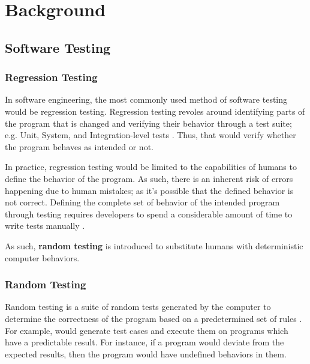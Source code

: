 \section{Background}
%

\subsection{Software Testing}

\subsubsection{Regression Testing}

In software engineering, the most commonly used method of software testing would be regression testing. Regression testing revoles around 
identifying parts of the program that is changed and verifying their behavior through a test suite; e.g. Unit, System, and Integration-level tests
\cite{testing}. Thus, that would verify whether the program behaves as intended or not.

In practice, regression testing would be limited to the capabilities of humans to define the behavior of the program. As such, there is an inherent 
risk of errors happening due to human mistakes; as it's possible that the defined behavior is not correct. Defining the complete set of behavior 
of the intended program through testing requires developers to spend a considerable amount of time to write tests manually \cite{differentialTesting}. 

As such, \textbf{random testing} is introduced to substitute humans with deterministic computer behaviors.

\subsubsection{Random Testing}

Random testing is a suite of random tests generated by the computer to determine the correctness of the program based on a predetermined 
set of rules \cite{differentialTesting}. For example, \cite[Sec. 2]{randomTesting} would generate test cases and 
execute them on programs which have a predictable result. For instance, if a program would deviate from the expected results, then the 
program would have undefined behaviors in them.

